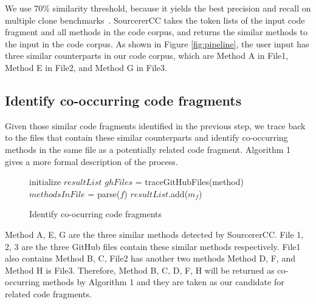We use 70\% similarity threshold, because it yields the best precision and recall on multiple clone benchmarks~\cite{sajnani2016sourcerercc}. SourcererCC takes the token lists of the input code fragment and all methods in the code corpus, and returns the similar methods to the input in the code corpus. As shown in Figure \ref{fig:pipeline}, the user input has three similar counterparts in our code corpus, which are {\ttt Method A} in {\ttt File1}, {\ttt Method E} in {\ttt File2}, and {\ttt Method G} in {\ttt File3}.

\subsection{Identify co-occurring code fragments}
Given those similar code fragments identified in the previous step, we trace back to the files that contain these similar counterparts and identify co-occurring methods in the same file as a potentially related code fragment. Algorithm 1 gives a more formal description of the process.

\begin{figure}[h]
		\label{alg: co-occur}
 \removelatexerror
\begin{algorithm}[H]
	\caption{Identify co-ocurring code fragments}
	initialize $resultList$\;
	{
		$ghFiles$ = traceGitHubFiles(method) \;
		{
			$methodsInFile$ = parse($f$)\;
			{
				{
					$resultList$.add($m_f$) \;
				}
			}
		} 
	}
\end{algorithm}
\end{figure}

{\ttt Method A, E, G} are the three similar methods detected by SourcererCC. {\ttt File 1, 2, 3} are the three GitHub files contain these similar methods respectively. 
{\ttt File1} also contains {\ttt Method B, C}, {\ttt File2} has another two methods {\ttt Method D, F}, and {\ttt Method H} is {\ttt File3}. Therefore, {\ttt Method B, C, D, F, H} will be returned as co-occurring methods by Algorithm 1 and they are taken as our candidate for related code fragments.


